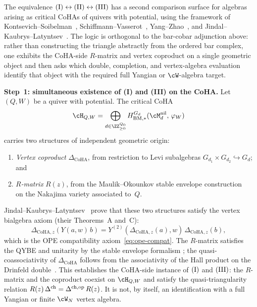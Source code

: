 \begin{remark}
\label{rem:independent-proof-coha}
The equivalence $\textup{(I)} \leftrightarrow \textup{(II)}
\leftrightarrow \textup{(III)}$ has a second comparison
surface for algebras arising as critical CoHAs of quivers with
potential, using the framework of
Kontsevich--Soibelman~\cite{KS11},
Schiffmann--Vasserot~\cite{SV13},
Yang--Zhao~\cite{YZ18a}, and
Jindal--Kaubrys--Latyntsev~\cite{JKL26}. The logic is
orthogonal to the bar-cobar adjunction above: rather than
constructing the triangle abstractly from the ordered bar
complex, one exhibits the CoHA-side $R$-matrix and vertex
coproduct on a single geometric object and then asks which
double, completion, and vertex-algebra evaluation identify that
object with the required full Yangian or $\cW$-algebra target.

\smallskip
\noindent\textbf{Step~1: simultaneous existence of (I) and (III)
on the CoHA.}
Let $(Q,W)$ be a quiver with potential. The critical CoHA
\[
 \cH_{Q,W}
 = \bigoplus_{d \in \ZZ_{\geq 0}^{Q_0}}
 H^{G_d}_{\mathrm{BM},*}
 (\cM_d^{\mathrm{nil}},\, \varphi_W)
\]
carries two structures of independent geometric origin:
\begin{enumerate}[label=\textup{(\alph*)}]
\item \emph{Vertex coproduct} $\Delta_{\mathrm{CoHA}}$, from
 restriction to Levi subalgebras
 $G_{d_1} \times G_{d_2} \hookrightarrow G_d$; and
\item \emph{$R$-matrix} $R(z)$, from the
 Maulik--Okounkov stable envelope
 construction~\cite{MO19} on the Nakajima variety
 associated to~$Q$.
\end{enumerate}
Jindal--Kaubrys--Latyntsev~\cite{JKL26} prove that these two
structures satisfy the vertex bialgebra axiom (their
Theorems~A and~C):
\begin{equation}\label{eq:v1-jkl-vertex-bialgebra}
 \Delta_{\mathrm{CoHA},z}(Y(a,w)\,b)
 = Y^{(2)}(\Delta_{\mathrm{CoHA},z}(a),w)\,
 \Delta_{\mathrm{CoHA},z}(b),
\end{equation}
which is the OPE compatibility
axiom~\eqref{eq:ope-compat}. The $R$-matrix satisfies the
QYBE and unitarity by the stable envelope formalism
\cite{MO19}; the quasi-coassociativity of
$\Delta_{\mathrm{CoHA}}$ follows from the
associativity of the Hall product on the Drinfeld
double~\cite{YZ18a}. This establishes the CoHA-side
instance of $\textup{(I)}$ and $\textup{(III)}$: the
$R$-matrix and the coproduct coexist on $\cH_{Q,W}$ and
satisfy the quasi-triangularity relation
$R(z)\, \Delta^{\mathrm{ch}} = \Delta^{\mathrm{ch},\mathrm{op}}\,
R(z)$. It is not, by itself, an identification with a full
Yangian or finite $\cW_N$ vertex algebra.


\end{remark}
